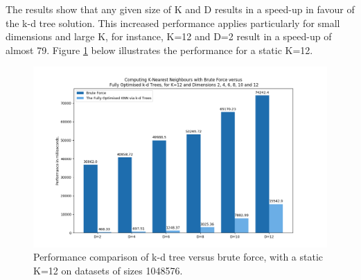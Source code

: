 
The results show that any given size of K and D results in a speed-up in favour of the k-d tree solution. This increased performance applies particularly for small dimensions and large K, for instance, K=12 and D=2 result in a speed-up of almost 79. Figure \ref{fig:b3} below illustrates the performance for a static K=12.


\begin{figure}[H]
\centering
\includegraphics[width=1.1\textwidth]{pics/plot-figs/new-brute-k12.png}
\caption{Performance comparison of k-d tree versus brute force, with a static K=12 on datasets of sizes 1048576.}
\label{fig:b3}
\end{figure}










